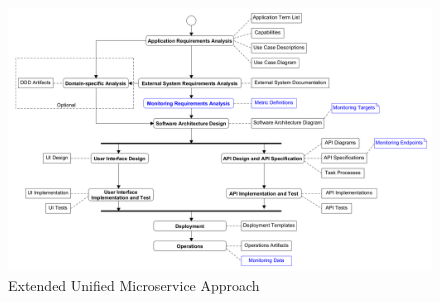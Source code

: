 \begin{figure}[tb]
	\centering
	\includegraphics[width=\textwidth]{figures/ume_approach_extended.png}
	\caption{Extended Unified Microservice Approach}
	\label{fig:ume_approach_extended}
\end{figure}